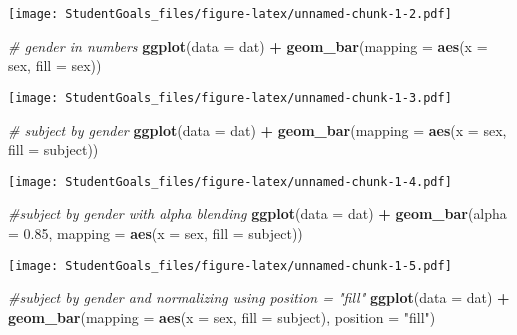 \documentclass[]{article}
\newenvironment{Shaded}{\begin{snugshade}}{\end{snugshade}}
\newcommand{\CommentTok}[1]{\textcolor[rgb]{0.56,0.35,0.01}{\textit{#1}}}
\newcommand{\DataTypeTok}[1]{\textcolor[rgb]{0.13,0.29,0.53}{#1}}
\newcommand{\FloatTok}[1]{\textcolor[rgb]{0.00,0.00,0.81}{#1}}
\newcommand{\KeywordTok}[1]{\textcolor[rgb]{0.13,0.29,0.53}{\textbf{#1}}}
\newcommand{\NormalTok}[1]{#1}
\newcommand{\OperatorTok}[1]{\textcolor[rgb]{0.81,0.36,0.00}{\textbf{#1}}}
\newcommand{\StringTok}[1]{\textcolor[rgb]{0.31,0.60,0.02}{#1}}
\begin{document}
\texttt{[image: StudentGoals\_files/figure-latex/unnamed-chunk-1-2.pdf]}

\begin{Shaded}
\begin{Highlighting}[]
\CommentTok{# gender in numbers}
\KeywordTok{ggplot}\NormalTok{(}\DataTypeTok{data =}\NormalTok{ dat) }\OperatorTok{+}\StringTok{ }
\StringTok{  }\KeywordTok{geom_bar}\NormalTok{(}\DataTypeTok{mapping =} \KeywordTok{aes}\NormalTok{(}\DataTypeTok{x =}\NormalTok{ sex, }\DataTypeTok{fill =}\NormalTok{ sex))}
\end{Highlighting}
\end{Shaded}

\texttt{[image: StudentGoals\_files/figure-latex/unnamed-chunk-1-3.pdf]}

\begin{Shaded}
\begin{Highlighting}[]
\CommentTok{# subject by gender}
\KeywordTok{ggplot}\NormalTok{(}\DataTypeTok{data =}\NormalTok{ dat) }\OperatorTok{+}\StringTok{ }
\StringTok{  }\KeywordTok{geom_bar}\NormalTok{(}\DataTypeTok{mapping =} \KeywordTok{aes}\NormalTok{(}\DataTypeTok{x =}\NormalTok{ sex, }\DataTypeTok{fill =}\NormalTok{ subject))}
\end{Highlighting}
\end{Shaded}

\texttt{[image: StudentGoals\_files/figure-latex/unnamed-chunk-1-4.pdf]}

\begin{Shaded}
\begin{Highlighting}[]
\CommentTok{#subject by gender with alpha blending}
\KeywordTok{ggplot}\NormalTok{(}\DataTypeTok{data =}\NormalTok{ dat) }\OperatorTok{+}\StringTok{ }
\StringTok{  }\KeywordTok{geom_bar}\NormalTok{(}\DataTypeTok{alpha =} \FloatTok{0.85}\NormalTok{, }\DataTypeTok{mapping =} \KeywordTok{aes}\NormalTok{(}\DataTypeTok{x =}\NormalTok{ sex, }\DataTypeTok{fill =}\NormalTok{ subject))}
\end{Highlighting}
\end{Shaded}

\texttt{[image: StudentGoals\_files/figure-latex/unnamed-chunk-1-5.pdf]}

\begin{Shaded}
\begin{Highlighting}[]
\CommentTok{#subject by gender and normalizing using position = "fill"}
\KeywordTok{ggplot}\NormalTok{(}\DataTypeTok{data =}\NormalTok{ dat) }\OperatorTok{+}\StringTok{ }
\StringTok{  }\KeywordTok{geom_bar}\NormalTok{(}\DataTypeTok{mapping =} \KeywordTok{aes}\NormalTok{(}\DataTypeTok{x =}\NormalTok{ sex, }\DataTypeTok{fill =}\NormalTok{ subject), }\DataTypeTok{position =} \StringTok{"fill"}\NormalTok{)}
\end{Highlighting}
\end{Shaded}
\end{document}
